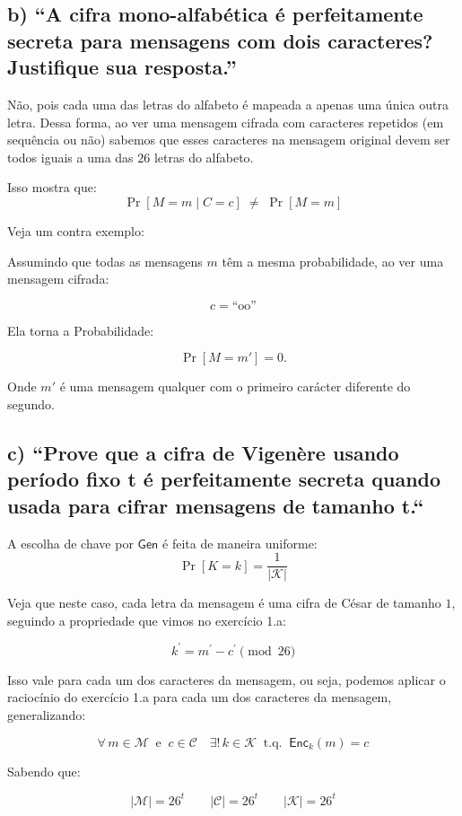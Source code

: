\documentclass[11pt,a4paper]{article}
\newcommand{\Enc}{\mathsf{Enc}}
\newcommand{\Gen}{\mathsf{Gen}}
\begin{document}
\clearpage

\subsection*{b) ``A cifra mono-alfabética é perfeitamente secreta para mensagens com dois caracteres? Justifique sua resposta.''}

Não, pois cada uma das letras do alfabeto é mapeada a apenas uma única outra letra.
Dessa forma, ao ver uma mensagem cifrada com caracteres repetidos (em sequência ou não) sabemos que esses caracteres na mensagem original devem ser todos
iguais a uma das $26$ letras do alfabeto.

Isso mostra que:
\[
\Pr[M=m \mid C=c] \;\neq\; \Pr[M=m]
\]

Veja um contra exemplo:

Assumindo que todas as mensagens $m$ têm a mesma probabilidade, ao ver uma mensagem cifrada:

\[
    c = \text{``oo''}
\]

Ela torna a Probabilidade:

\[
\Pr[M=m'] = 0.
\]

Onde $m'$ é uma mensagem qualquer com o primeiro carácter diferente do segundo.

\subsection*{c) ``Prove que a cifra de Vigenère usando período fixo t é perfeitamente secreta quando
usada para cifrar mensagens de tamanho t.``}

A escolha de chave por $\Gen$ é feita de maneira uniforme:
\[
\Pr[K=k] = \frac{1}{|\mathcal{K}|}
\]

Veja que neste caso, cada letra da mensagem é uma cifra de César de tamanho $1$, seguindo a propriedade que vimos no exercício 1.a:

\[
k^{'} = m^{'} - c^{'} \pmod{26}
\]

Isso vale para cada um dos caracteres da mensagem, ou seja, podemos aplicar o raciocínio do exercício 1.a para cada um dos
caracteres da mensagem, generalizando:

\[
\forall\, m \in \mathcal{M} \ \text{ e } \ c \in \mathcal{C}
\quad \exists!\, k \in \mathcal{K} \ \text{ t.q. } \ \Enc_k(m) = c
\]

Sabendo que:

\[
    |\mathcal{M}| = 26^{t} \qquad |\mathcal{C}| = 26^{t} \qquad |\mathcal{K}| = 26^{t}
\]
\end{document}
